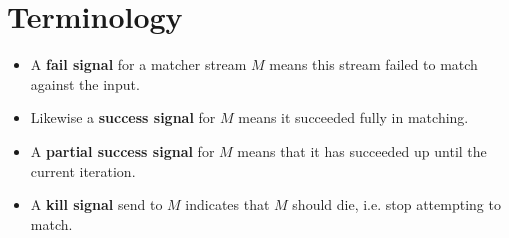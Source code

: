 \section{Terminology}

\begin{itemize}
\item A \textbf{fail signal} for a matcher stream $M$ means this stream failed to match against the input.  
\item Likewise a \textbf{success signal} for $M$ means it succeeded fully in matching.
\item A \textbf{partial success signal} for $M$ means that it has succeeded up until the current iteration.
\item A \textbf{kill signal} send to $M$ indicates that $M$ should die, i.e. stop attempting to match.
  \end{itemize}
